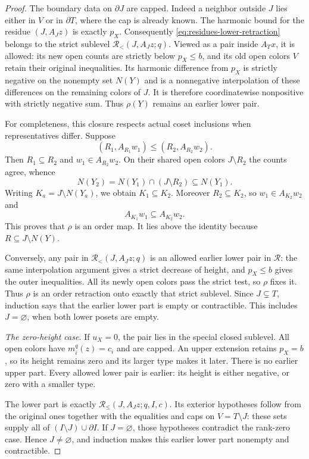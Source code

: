 \begin{proof}
The boundary data on $\partial J$ are capped.  Indeed a neighbor
outside $J$ lies either in $V$ or in $\partial T$, where the cap is
already known.  The harmonic bound for the residue $(J,A_Jz)$ is
exactly $p_X$.  Consequently \eqref{eq:residues-lower-retraction}
belongs to the strict sublevel
$\mathcal R_{<}(J,A_Jz;q)$.  Viewed as a pair inside $A_Tx$, it
is allowed: its new open counts are strictly below $p_X\le b$,
and its old open colors $V$ retain their original inequalities.
Its harmonic difference from $p_X$ is strictly negative on the
nonempty set $N(Y)$ and is a nonnegative interpolation of these
differences on the remaining colors of $J$.  It is therefore
coordinatewise nonpositive with strictly negative sum.  Thus
$\rho(Y)$ remains an earlier lower pair.

For completeness, this closure respects actual coset inclusions
when representatives differ.  Suppose
\[
 (R_1,A_{R_1}w_1)\le(R_2,A_{R_2}w_2).
\]
Then $R_1\subseteq R_2$ and $w_1\in A_{R_2}w_2$.  On their
shared open colors $J\setminus R_2$ the counts agree, whence
\[
 N(Y_2)=N(Y_1)\cap(J\setminus R_2)\subseteq N(Y_1).
\]
Writing $K_a=J\setminus N(Y_a)$, we obtain $K_1\subseteq K_2$.
Moreover $R_2\subseteq K_2$, so $w_1\in A_{K_2}w_2$ and
\[
 A_{K_1}w_1\subseteq A_{K_2}w_2.
\]
This proves that $\rho$ is an order map.  It lies above the identity
because $R\subseteq J\setminus N(Y)$.

Conversely, any pair in $\mathcal R_{<}(J,A_Jz;q)$ is an allowed
earlier lower pair in $\mathcal R$: the same interpolation argument
gives a strict decrease of height, and $p_X\le b$ gives the outer
inequalities.  All its newly open colors pass the strict test, so
$\rho$ fixes it.  Thus $\rho$ is an order retraction onto exactly
that strict sublevel.  Since $J\subsetneq T$, induction says that
the earlier lower part is empty or contractible.  This includes
$J=\varnothing$, when both lower posets are empty.

\medskip\noindent
\textit{The zero-height case.}
If $u_X=0$, the pair lies in the special closed sublevel.  All open
colors have $m_i^q(z)=c_i$ and are capped.  An upper extension retains
$p_X=b$, so its height remains zero and its larger type makes it
later.  There is no earlier upper part.  Every allowed lower pair is
earlier: its height is either negative, or zero with a smaller type.

The lower part is exactly
$\mathcal R_{\le}(J,A_Jz;q,I,c)$.  Its exterior hypotheses follow
from the original ones together with the equalities and caps on
$V=T\setminus J$: these sets supply all of
$(I\setminus J)\cup\partial I$.  If $J=\varnothing$, those
hypotheses contradict the rank-zero case.  Hence $J\ne\varnothing$,
and induction makes this earlier lower part nonempty and
contractible.


\end{proof}
